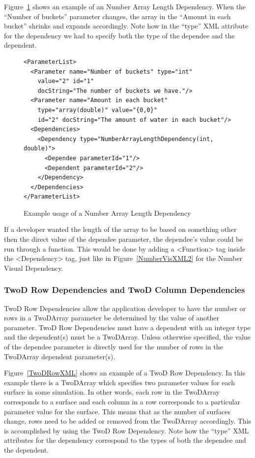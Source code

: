 Figure~\ref{ArrayLengthXML} shows an example of an Number Array Length Dependency. When the ``Number of buckets'' parameter changes, the array in 
the ``Amount in each bucket'' shrinks and expands accordingly. Note how in the ``type'' XML attribute for the dependency we had to specify both the 
type of the dependee and the dependent. 
\begin{figure}
\centering
{\footnotesize
\begin{Verbatim}
<ParameterList>
  <Parameter name="Number of buckets" type="int"
    value="2" id="1" 
    docString="The number of buckets we have."/>
  <Parameter name="Amount in each bucket" 
    type="array(double)" value="{0,0}"
    id="2" docString="The amount of water in each bucket"/>
  <Dependencies>
    <Dependency type="NumberArrayLengthDependency(int, double)">
      <Dependee parameterId="1"/>
      <Dependent parameterId="2"/>
    </Dependency>
  </Dependencies>
</ParameterList>
\end{Verbatim}
}
\caption{Example usage of a Number Array Length Dependency}
\label{ArrayLengthXML}
\end{figure}

If a developer wanted the length of the array to be based on something other then the direct value of the dependee parameter, the dependee's
value could be run through a function. This would 
be done by adding a <Function> tag inside the <Dependency> tag, just like in Figure~\ref{NumberVisXML2} for the Number Visual Dependency.

\subsubsection{TwoD Row Dependencies and TwoD Column Dependencies}
TwoD Row Dependencies allow the application developer to have the number or rows in a TwoDArray parameter be determined by the value of another
parameter. TwoD Row Dependencies must have a dependent with an integer type and the dependent(s) must be a TwoDArray. Unless otherwise specified, the
value of the dependee parameter is directly used for the number of rows in the TwoDArray dependent parameter(s).

Figure~\ref{TwoDRowXML} shows an example of a TwoD Row Dependency. In this example there is a TwoDArray which specifies two parameter values for each surface
in some simulation. In other words, each row in the TwoDArray corresponds to a surface and each column in a row corresponds to a particular 
parameter value for the surface. This means that as the number of surfaces change, rows need to be added or removed from the TwoDArray accordingly.
This is accomplished by using the TwoD Row Dependency. Note how the ``type'' XML attributes for 
the dependency correspond to the types of both the dependee and the dependent.


